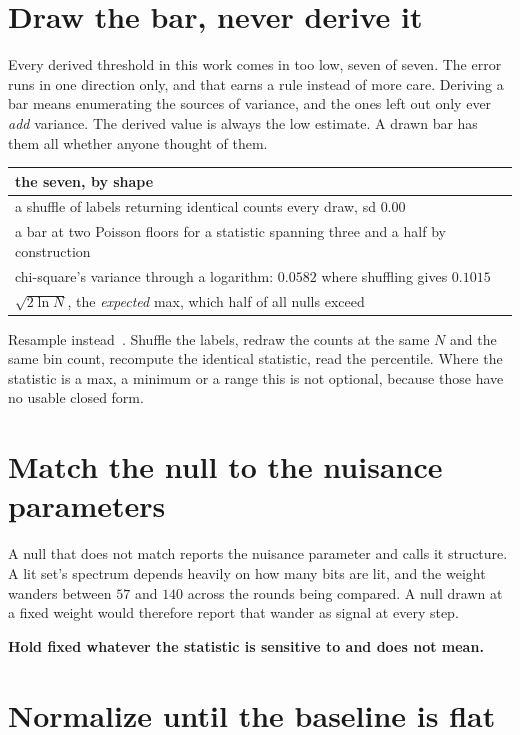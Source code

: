 \section{Draw the bar, never derive it}

Every derived threshold in this work comes in too low, seven of seven. The error runs in one direction only, and that earns a rule instead of more care. Deriving a bar means enumerating the sources of variance, and the ones left out only ever \emph{add} variance. The derived value is always the low estimate. A drawn bar has them all whether anyone thought of them.

\begin{center}
\begin{tabular}{@{}l@{}}
\toprule
the seven, by shape \\
\midrule
a shuffle of labels returning identical counts every draw, sd \(0.00\) \\
a bar at two Poisson floors for a statistic spanning three and a half by construction \\
chi-square's variance through a logarithm: \(0.0582\) where shuffling gives \(0.1015\) \\
\(\sqrt{2 \ln N}\), the \emph{expected} max, which half of all nulls exceed \\
\bottomrule
\end{tabular}
\end{center}

Resample instead~\cite{src:Westfall-and-Young-1993}. Shuffle the labels, redraw the counts at the same \(N\) and the same bin count, recompute the identical statistic, read the percentile. Where the statistic is a max, a minimum or a range this is not optional, because those have no usable closed form.

\section{Match the null to the nuisance parameters}

A null that does not match reports the nuisance parameter and calls it structure. A lit set's spectrum depends heavily on how many bits are lit, and the weight wanders between \(57\) and \(140\) across the rounds being compared. A null drawn at a fixed weight would therefore report that wander as signal at every step.

\textbf{Hold fixed whatever the statistic is sensitive to and does not mean.}

\section{Normalize until the baseline is flat}


